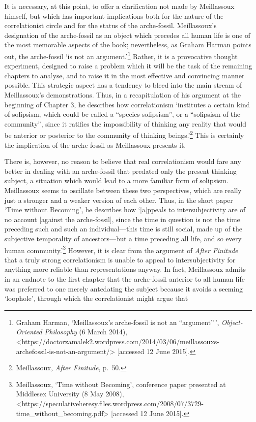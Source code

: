 \documentclass[]{article}
\begin{document}
It is necessary, at this point, to offer a clarification not made by
Meillassoux himself, but which has important implications both for the
nature of the correlationist circle and for the status of the
arche-fossil. Meillassoux's designation of the arche-fossil as an object
which precedes all human life is one of the most memorable aspects of
the book; nevertheless, as Graham Harman points out, the arche-fossil
`is not an argument.'\footnote{Graham Harman, `Meillassoux's
  arche-fossil is not an ``argument''\,', \emph{Object-Oriented
  Philosophy} (6 March 2014),
  \textless{}https://doctorzamalek2.wordpress.com/2014/03/06/meillassouxs-archefossil-is-not-an-argument/\textgreater{}
  {[}accessed 12 June 2015{]}.} Rather, it is a provocative thought
experiment, designed to raise a problem which it will be the task of the
remaining chapters to analyse, and to raise it in the most effective and
convincing manner possible. This strategic aspect has a tendency to
bleed into the main stream of Meillassoux's demonstrations. Thus, in a
recapitulation of his argument at the beginning of Chapter 3, he
describes how correlationism `institutes a certain kind of solipsism,
which could be called a ``species solipsism'', or a ``solipsism of the
community'', since it ratifies the impossibility of thinking any reality
that would be anterior or posterior to the community of thinking
beings.'\footnote{Meillassoux, \emph{After Finitude}, p.~50.} This is
certainly the implication of the arche-fossil as Meillassoux presents
it.

There is, however, no reason to believe that real correlationism would
fare any better in dealing with an arche-fossil that predated only the
present thinking subject, a situation which would lead to a more
familiar form of solipsism. Meillassoux seems to oscillate between these
two perspectives, which are really just a stronger and a weaker version
of each other. Thus, in the short paper `Time without Becoming', he
describes how `{[}a{]}ppeals to intersubjectivity are of no account
{[}against the arche-fossil{]}, since the time in question is not the
time preceding such and such an individual---this time is still social,
made up of the subjective temporality of ancestors---but a time
preceding all life, and so every human community.'\footnote{Meillassoux,
  `Time without Becoming', conference paper presented at Middlesex
  University (8 May 2008),
  \textless{}https://speculativeheresy.files.wordpress.com/2008/07/3729-time\_without\_becoming.pdf\textgreater{}
  {[}accessed 12 June 2015{]}.} However, it is clear from the argument
of \emph{After Finitude} that a truly strong correlationism is unable to
appeal to intersubjectivity for anything more reliable than
representations anyway. In fact, Meillassoux admits in an endnote to the
first chapter that the arche-fossil anterior to all human life was
preferred to one merely antedating the subject because it avoids a
seeming `loophole', through which the correlationist might argue that
\end{document}
